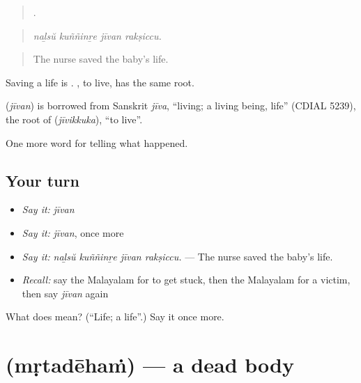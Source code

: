 \begin{quote}
   .
\end{quote}

\begin{quote}
\emph{naḻsŭ kuññinṟe jīvan rakṣiccu.}
\end{quote}

\begin{quote}
The nurse saved the baby's life.
\end{quote}

Saving a life is  . , to live, has the same root.

\begin{cousinweb}
\textbf{} (\emph{jīvan}) is borrowed from Sanskrit \emph{jīva}, \textquotedblleft{}living; a living being, life\textquotedblright{} (CDIAL 5239), the root of  (\emph{jīvikkuka}), \textquotedblleft{}to live\textquotedblright{}.
\end{cousinweb}

\begin{grammarlens}[title={What you've built}]
One more word for telling what happened.
\end{grammarlens}

\subsection*{Your turn}
\begin{itemize}
\raggedright
  \item \emph{Say it:} \emph{jīvan}
  \item \emph{Say it:} \emph{jīvan}, once more
  \item \emph{Say it:} \emph{naḻsŭ kuññinṟe jīvan rakṣiccu.} — The nurse saved the baby's life.
  \item \emph{Recall:} say the Malayalam for to get stuck, then the Malayalam for a victim, then say \emph{jīvan} again
\end{itemize}

\begin{tcolorbox}[breakable,colback=teal!4,colframe=teal!35!black,title={Before you move on}]
What does  mean? (\textquotedblleft{}Life; a life\textquotedblright{}.) Say it once more.
\end{tcolorbox}
\section[\texorpdfstring{\ml{മൃതദേഹം} (mṛtadēhaṁ)}{മൃതദേഹം (mṛtadēhaṁ)}]{ (mṛtadēhaṁ) — a dead body}

